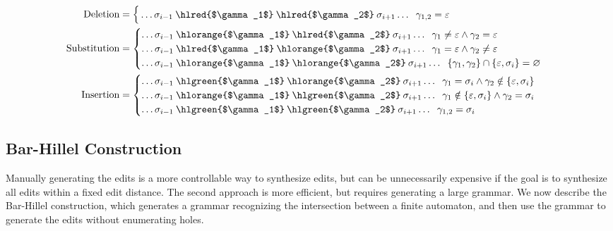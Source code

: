 \documentclass[runningheads]{llncs}
\begin{document}
\begin{align*}
    \text{Deletion}&=\begin{cases}
       \,\ldots\sigma_{i-1}\:\text{\hlred{$\gamma_1$}\:\hlred{$\gamma_2$}}\:\sigma_{i+1}\ldots\hspace{0.2cm}\gamma_{1, 2} = \varepsilon\label{eq:del}
    \end{cases}\\
    \text{Substitution}&=\begin{cases}
       \ldots\sigma_{i-1}\:\text{\hlorange{$\gamma_1$}\:\hlred{$\gamma_2$}}\:\sigma_{i+1}\ldots\hspace{0.2cm}\gamma_1 \neq \varepsilon \land \gamma_2 = \varepsilon\\
       \ldots\sigma_{i-1}\:\text{\hlred{$\gamma_1$}\:\hlorange{$\gamma_2$}}\:\sigma_{i+1}\ldots\hspace{0.2cm}\gamma_1 = \varepsilon \land \gamma_2 \neq \varepsilon\\
       \ldots\sigma_{i-1}\:\text{\hlorange{$\gamma_1$}\:\hlorange{$\gamma_2$}}\:\sigma_{i+1}\ldots\hspace{0.2cm}\{\gamma_1, \gamma_2\}\cap\{\varepsilon, \sigma_i\} = \varnothing
    \end{cases}\\
    \text{Insertion}&=\begin{cases}
       \ldots\sigma_{i-1}\:\text{\hlgreen{$\gamma_1$}\:\hlorange{$\gamma_2$}}\:\sigma_{i+1}\ldots\hspace{0.2cm}\gamma_1 = \sigma_i \land \gamma_2 \notin \{\varepsilon,  \sigma_i\}\label{eq:ins2}\\
       \ldots\sigma_{i-1}\:\text{\hlorange{$\gamma_1$}\:\hlgreen{$\gamma_2$}}\:\sigma_{i+1}\ldots\hspace{0.2cm}\gamma_1 \notin \{\varepsilon, \sigma_i\} \land \gamma_2 = \sigma_i\label{eq:ins1}\\
       \ldots\sigma_{i-1}\:\text{\hlgreen{$\gamma_1$}\:\hlgreen{$\gamma_2$}}\:\sigma_{i+1}\ldots\hspace{0.2cm}\gamma_{1,2} = \sigma_i\label{eq:copy}
    \end{cases}
\end{align*}

\subsection{Bar-Hillel Construction}

Manually generating the edits is a more controllable way to synthesize edits, but can be unnecessarily expensive if the goal is to synthesize all edits within a fixed edit distance. The second approach is more efficient, but requires generating a large grammar. We now describe the Bar-Hillel construction, which generates a grammar recognizing the intersection between a finite automaton, and then use the grammar to generate the edits without enumerating holes.
\end{document}
